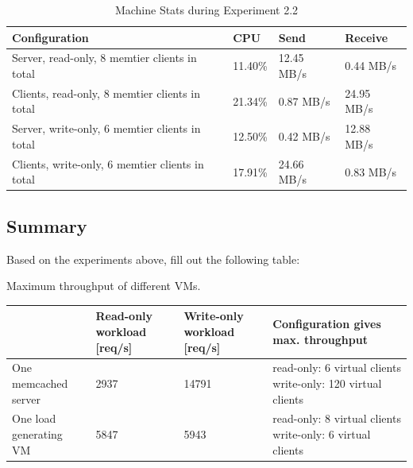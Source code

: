 \documentclass[11pt,a4paper]{article}
\begin{document}
\begin{center}
    \begin{table}
    	\begin{tabular}{|l|p{2cm}|p{2cm}|p{2cm}|}
            \hline \textbf{Configuration} & \textbf{CPU} & \textbf{Send} & \textbf{Receive}\\
            \hline Server, read-only, 8 memtier clients in total & 11.40\%         & 12.45 MB/s    & 0.44 MB/s\\
            \hline Clients, read-only, 8 memtier clients in total & 21.34\%           & 0.87 MB/s     & 24.95 MB/s\\
            \hline Server, write-only,  6 memtier clients in total & 12.50\%        & 0.42 MB/s     & 12.88 MB/s\\
            \hline Clients, write-only, 6 memtier clients in total & 17.91\%       & 24.66 MB/s     & 0.83 MB/s\\
            \hline
    	\end{tabular}
	\caption{Machine Stats during Experiment 2.2}
    \label{dstat:2-2}
	\end{table}
\end{center}



\subsection{Summary}

Based on the experiments above, fill out the following table:

\begin{center}
	{Maximum throughput of different VMs.}
	\begin{tabular}{|l|p{2cm}|p{2cm}|p{7cm}|}
		\hline                        & Read-only workload [req/s] & Write-only workload [req/s] & Configuration gives max. throughput \\ 
		\hline One memcached server   &          2937          &      14791               &            read-only: 6 virtual clients \newline write-only: 120 virtual clients                         \\ 
		\hline One load generating VM &        5847            &          5943           &         read-only: 8 virtual clients \newline write-only: 6 virtual clients                            \\ 
		\hline 
	\end{tabular}
\end{center}
\end{document}
